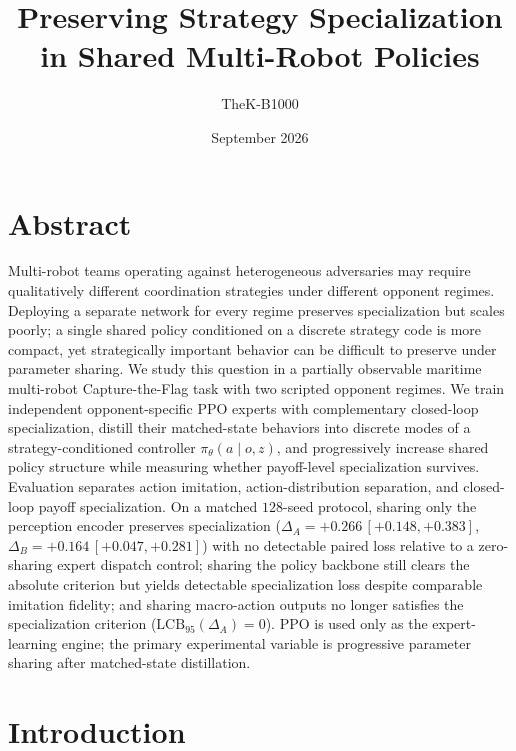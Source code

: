 \documentclass{article}
\title{Preserving Strategy Specialization in Shared Multi-Robot Policies}
\author{TheK-B1000}
\date{September 2026}
\begin{document}
\maketitle

\section*{Abstract}

Multi-robot teams operating against heterogeneous adversaries may require
qualitatively different coordination strategies under different opponent
regimes. Deploying a separate network for every regime preserves specialization
but scales poorly; a single shared policy conditioned on a discrete strategy
code is more compact, yet strategically important behavior can be difficult to
preserve under parameter sharing. We study this question in a partially
observable maritime multi-robot Capture-the-Flag task with two scripted opponent
regimes. We train independent opponent-specific PPO experts with complementary
closed-loop specialization, distill their matched-state behaviors into discrete
modes of a strategy-conditioned controller $\pi_\theta(a\mid o,z)$, and
progressively increase shared policy structure while measuring whether
payoff-level specialization survives. Evaluation separates action imitation,
action-distribution separation, and closed-loop payoff specialization. On a
matched $128$-seed protocol, sharing only the perception encoder preserves
specialization
($\Delta_A=+0.266\,[+0.148,+0.383]$, $\Delta_B=+0.164\,[+0.047,+0.281]$)
with no detectable paired loss relative to a zero-sharing expert dispatch
control; sharing the policy backbone still clears the absolute criterion but yields
detectable specialization loss despite comparable imitation fidelity; and
sharing macro-action outputs no longer satisfies the specialization criterion
($\mathrm{LCB}_{95}(\Delta_A)=0$). PPO is used only as the expert-learning
engine; the primary experimental variable is progressive parameter sharing after
matched-state distillation.

\section{Introduction}
\end{document}
